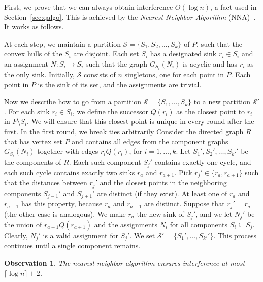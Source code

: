 \documentclass[envcountsect,envcountsame,runningheads,a4paper]{llncs}
\newtheorem{obs}[theorem]{Observation}
\begin{document}
First, we prove  that we can always obtain
interference $O(\log n)$, a fact used in Section~\ref{sec:qalgo}.
This is achieved by the \emph{Nearest-Neighbor-Algorithm}
(NNA)~\cite{RickenbachWaZo09,Korman12}.
It works as follows.

At each step, we maintain a partition
$\mathcal{S} = \{S_1, S_2, \ldots, S_k\}$ of $P$, such that
the convex hulls of the $S_i$ are disjoint. Each set $S_i$
has a designated sink $r_i \in S_i$ and an assignment
$N: S_i \rightarrow S_i$ such that the graph
$G_{S_i}(N_i)$ is acyclic and has $r_i$ as the only sink.
Initially, $\mathcal{S}$ consists of $n$ singletons, one
for each point in $P$. Each point in $P$ is the sink of its
set, and the assignments are trivial.

Now we describe how to go from a partition
$\mathcal{S} = \{S_1, \dots, S_k\}$ to a new partition $\mathcal{S}'$.
For each sink $r_i \in S_i$, we define the successor $Q(r_i)$ as the closest
point to $r_i$ in $P \setminus S_i$. We will ensure that this closest
point is unique in every round after the first.
In the first round, we break
ties arbitrarily
Consider the directed graph $R$ that has vertex set $P$ and
contains all edges from the component graphs $G_{S_i}(N_i)$ together
with edges $r_i Q(r_i)$, for $i = 1, \dots, k$. Let $S_1', S_2', \dots, S_{k'}'$ be the
components of $R$. Each such component $S_j'$ contains exactly one cycle,
and each such cycle contains exactly two sinks $r_a$ and $r_{a+1}$.
Pick $r_j' \in \{r_a, r_{a+1}\}$ such that the distances between
$r_j'$ and the closest points in the neighboring components
$S_{j-1}'$ and $S_{j+1}'$ are distinct (if they exist). At least
one of $r_a$ and $r_{a+1}$ has this property, because $r_a$ and
$r_{a+1}$ are distinct. Suppose that $r_j' = r_a$ (the other case
is analogous). We make $r_a$ the new sink of $S_j'$, and we
let $N_j'$ be the union of $r_{a+1} Q(r_{a+1})$ and
the assignments $N_i$ for all
components $S_i \subseteq S_j$. Clearly, $N_j'$ is a valid assignment
for $S_j'$. We set $\mathcal{S}' = \{S_1', \dots, S_{k'}'\}$.
This process continues until a single component remains.

\begin{obs}\label{obs:nna_upper}
The nearest neighbor algorithm ensures interference at most
$\lceil \log n \rceil + 2$.
\end{obs}
\end{document}
